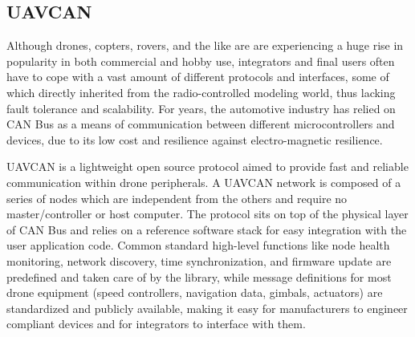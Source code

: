 \subsection{UAVCAN}

Although drones, copters, rovers, and the like are are experiencing a huge rise in popularity in both commercial and hobby use, integrators and final users often have to cope with a vast amount of different protocols and interfaces, some of which directly inherited from the radio-controlled modeling world, thus lacking fault tolerance and scalability.
For years, the automotive industry has relied on CAN Bus as a means of communication between different microcontrollers and devices, due to its low cost and resilience against electro-magnetic resilience.

UAVCAN is a lightweight open source protocol aimed to provide fast and reliable communication within drone peripherals. \cite{can}
A UAVCAN network is composed of a series of nodes which are independent from the others and require no master/controller or host computer.
The protocol sits on top of the physical layer of CAN Bus and relies on a reference software stack for easy integration with the user application code.
Common standard high-level functions like node health monitoring, network discovery, time synchronization, and firmware update are predefined and taken care of by the library, while  message definitions for most drone equipment (speed controllers, navigation data, gimbals, actuators) are standardized and publicly available, making it easy for manufacturers to engineer compliant devices and for integrators to interface with them.
